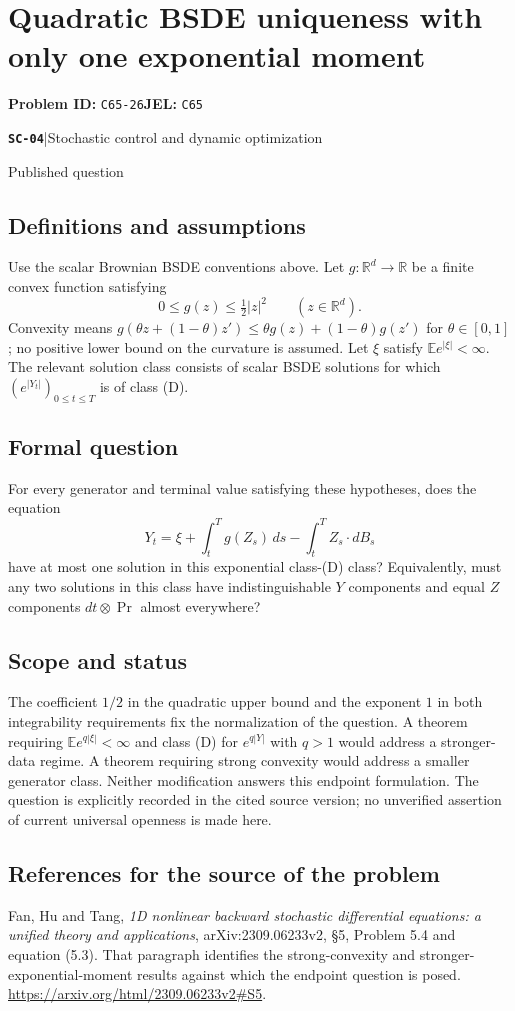 \documentclass[11pt,a4paper]{article}
\newcommand{\R}{\mathbb R}
\newcommand{\E}{\mathbb E}
\newcommand{\entrymeta}[3]{{\sffamily\small\color{muted}\textbf{\texttt{#1}}\quad|\quad #2\par #3\par}}
\begin{document}
\section*{Quadratic BSDE uniqueness with only one exponential moment}
\textbf{Problem ID:} \texttt{C65-26}\quad \textbf{JEL:} \texttt{C65}\par
\label{problem:OP-0565}
\label{beyond:SC-04}
\entrymeta{SC-04}{Stochastic control and dynamic optimization}{Published question}
\subsection*{Definitions and assumptions}
Use the scalar Brownian BSDE conventions above. Let
$g:\R^d\to\R$ be a finite convex function satisfying
\[
 0\leq g(z)\leq\tfrac12|z|^2\qquad(z\in\R^d).
\]
Convexity means
$g(\theta z+(1-\theta)z')\leq\theta g(z)+(1-\theta)g(z')$
for $\theta\in[0,1]$; no positive lower bound on the curvature is
assumed. Let $\xi$ satisfy $\E e^{|\xi|}<\infty$.
The relevant solution class consists of scalar BSDE solutions for which
$(e^{|Y_t|})_{0\leq t\leq T}$ is of class (D).
\subsection*{Formal question}
For every generator and terminal value satisfying these hypotheses,
does the equation
\[
 Y_t=\xi+\int_t^T g(Z_s)\,ds-\int_t^T Z_s\cdot dB_s
\]
have at most one solution in this exponential class-(D) class?
Equivalently, must any two solutions in this class have indistinguishable
$Y$ components and equal $Z$ components $dt\otimes\Pr$ almost everywhere?
\subsection*{Scope and status}
The coefficient $1/2$ in the quadratic upper bound and the exponent
$1$ in both integrability requirements fix the normalization of the
question. A theorem requiring $\E e^{q|\xi|}<\infty$ and class (D)
for $e^{q|Y|}$ with $q>1$ would address a stronger-data regime.
A theorem requiring strong convexity would address a smaller generator
class. Neither modification answers this endpoint formulation. The
question is explicitly recorded in the cited source version; no
unverified assertion of current universal openness is made here.
\subsection*{References for the source of the problem}
Fan, Hu and Tang, \emph{1D nonlinear backward stochastic differential
equations: a unified theory and applications}, arXiv:2309.06233v2,
\S5, Problem 5.4 and equation (5.3). That paragraph identifies the
strong-convexity and stronger-exponential-moment results against which
the endpoint question is posed.
\url{https://arxiv.org/html/2309.06233v2#S5}.
\end{document}
